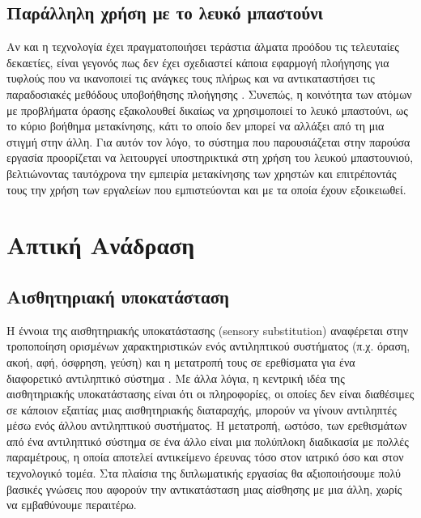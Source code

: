 \subsection{Παράλληλη χρήση με το λευκό μπαστούνι}
Αν και η τεχνολογία έχει πραγματοποιήσει τεράστια άλματα προόδου τις τελευταίες δεκαετίες, είναι γεγονός πως δεν έχει σχεδιαστεί κάποια εφαρμογή πλοήγησης για τυφλούς που να ικανοποιεί τις ανάγκες τους πλήρως και να αντικαταστήσει τις παραδοσιακές μεθόδους υποβοήθησης πλοήγησης \cite{LowVisio34:online}. Συνεπώς, η κοινότητα των ατόμων με προβλήματα όρασης εξακολουθεί δικαίως να χρησιμοποιεί το λευκό μπαστούνι, ως το κύριο βοήθημα μετακίνησης, κάτι το οποίο δεν μπορεί να αλλάξει από τη μια στιγμή στην άλλη. Για αυτόν τον λόγο, το σύστημα που παρουσιάζεται στην παρούσα εργασία προορίζεται να λειτουργεί υποστηρικτικά στη χρήση του λευκού μπαστουνιού, βελτιώνοντας ταυτόχρονα την εμπειρία μετακίνησης των χρηστών και επιτρέποντάς τους την χρήση των εργαλείων που εμπιστεύονται και με τα οποία έχουν εξοικειωθεί.

\section{Απτική Ανάδραση}
\subsection{Αισθητηριακή υποκατάσταση}
Η έννοια της αισθητηριακής υποκατάστασης (sensory substitution) αναφέρεται στην τροποποίηση ορισμένων χαρακτηριστικών ενός αντιληπτικού συστήματος (π.χ. όραση, ακοή, αφή, όσφρηση, γεύση) και η μετατροπή τους σε ερεθίσματα για ένα διαφορετικό αντιληπτικό σύστημα \cite{wiki:sensory_sub}. Με άλλα λόγια, η κεντρική ιδέα της αισθητηριακής υποκατάστασης είναι ότι οι πληροφορίες, οι οποίες δεν είναι διαθέσιμες σε κάποιον εξαιτίας μιας αισθητηριακής διαταραχής, μπορούν να γίνουν αντιληπτές μέσω ενός άλλου αντιληπτικού συστήματος. Η μετατροπή, ωστόσο, των ερεθισμάτων από ένα αντιληπτικό σύστημα σε ένα άλλο είναι μια πολύπλοκη διαδικασία με πολλές παραμέτρους, η οποία αποτελεί αντικείμενο έρευνας τόσο στον ιατρικό όσο και στον τεχνολογικό τομέα. Στα πλαίσια της διπλωματικής εργασίας θα αξιοποιήσουμε πολύ βασικές γνώσεις που αφορούν την αντικατάσταση μιας αίσθησης με μια άλλη, χωρίς να εμβαθύνουμε περαιτέρω.


